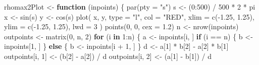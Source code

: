 \documentclass[
  12pt,
  letterpaper,
  DIV=11,
  numbers=noendperiod]{scrreprt}
\newenvironment{Shaded}{\begin{snugshade}}{\end{snugshade}}
\newcommand{\AttributeTok}[1]{\textcolor[rgb]{0.40,0.45,0.13}{#1}}
\newcommand{\ControlFlowTok}[1]{\textcolor[rgb]{0.00,0.23,0.31}{\textbf{#1}}}
\newcommand{\DecValTok}[1]{\textcolor[rgb]{0.68,0.00,0.00}{#1}}
\newcommand{\FloatTok}[1]{\textcolor[rgb]{0.68,0.00,0.00}{#1}}
\newcommand{\FunctionTok}[1]{\textcolor[rgb]{0.28,0.35,0.67}{#1}}
\newcommand{\NormalTok}[1]{\textcolor[rgb]{0.00,0.23,0.31}{#1}}
\newcommand{\OtherTok}[1]{\textcolor[rgb]{0.00,0.23,0.31}{#1}}
\newcommand{\SpecialCharTok}[1]{\textcolor[rgb]{0.37,0.37,0.37}{#1}}
\newcommand{\StringTok}[1]{\textcolor[rgb]{0.13,0.47,0.30}{#1}}
\theoremstyle{remark}
\begin{document}
\begin{Shaded}
\begin{Highlighting}[]
\NormalTok{rhomax2Plot }\OtherTok{\textless{}{-}} \ControlFlowTok{function}\NormalTok{ (inpoints) \{}
  \FunctionTok{par}\NormalTok{(}\AttributeTok{pty =} \StringTok{"s"}\NormalTok{)}
\NormalTok{  s }\OtherTok{\textless{}{-}}\NormalTok{ (}\DecValTok{0}\SpecialCharTok{:}\DecValTok{500}\NormalTok{) }\SpecialCharTok{/} \DecValTok{500} \SpecialCharTok{*} \DecValTok{2} \SpecialCharTok{*}\NormalTok{ pi}
\NormalTok{  x }\OtherTok{\textless{}{-}} \FunctionTok{sin}\NormalTok{(s)}
\NormalTok{  y }\OtherTok{\textless{}{-}} \FunctionTok{cos}\NormalTok{(s)}
  \FunctionTok{plot}\NormalTok{(}
\NormalTok{    x,}
\NormalTok{    y,}
    \AttributeTok{type =} \StringTok{"l"}\NormalTok{,}
    \AttributeTok{col =} \StringTok{"RED"}\NormalTok{,}
    \AttributeTok{xlim =} \FunctionTok{c}\NormalTok{(}\SpecialCharTok{{-}}\FloatTok{1.25}\NormalTok{, }\FloatTok{1.25}\NormalTok{),}
    \AttributeTok{ylim =} \FunctionTok{c}\NormalTok{(}\SpecialCharTok{{-}}\FloatTok{1.25}\NormalTok{, }\FloatTok{1.25}\NormalTok{),}
    \AttributeTok{lwd =} \DecValTok{3}
\NormalTok{  )}
  \FunctionTok{points}\NormalTok{(}\DecValTok{0}\NormalTok{, }\DecValTok{0}\NormalTok{, }\AttributeTok{cex =} \FloatTok{1.2}\NormalTok{)}
\NormalTok{  n }\OtherTok{\textless{}{-}} \FunctionTok{nrow}\NormalTok{(inpoints)}
\NormalTok{  outpoints }\OtherTok{\textless{}{-}} \FunctionTok{matrix}\NormalTok{(}\DecValTok{0}\NormalTok{, n, }\DecValTok{2}\NormalTok{)}
  \ControlFlowTok{for}\NormalTok{ (i }\ControlFlowTok{in} \DecValTok{1}\SpecialCharTok{:}\NormalTok{n) \{}
\NormalTok{    a }\OtherTok{\textless{}{-}}\NormalTok{ inpoints[i, ]}
    \ControlFlowTok{if}\NormalTok{ (i }\SpecialCharTok{==}\NormalTok{ n) \{}
\NormalTok{      b }\OtherTok{\textless{}{-}}\NormalTok{ inpoints[}\DecValTok{1}\NormalTok{, ]}
\NormalTok{    \} }\ControlFlowTok{else}\NormalTok{ \{}
\NormalTok{      b }\OtherTok{\textless{}{-}}\NormalTok{ inpoints[i }\SpecialCharTok{+} \DecValTok{1}\NormalTok{, ]}
\NormalTok{    \}}
\NormalTok{    d }\OtherTok{\textless{}{-}}\NormalTok{ a[}\DecValTok{1}\NormalTok{] }\SpecialCharTok{*}\NormalTok{ b[}\DecValTok{2}\NormalTok{] }\SpecialCharTok{{-}}\NormalTok{ a[}\DecValTok{2}\NormalTok{] }\SpecialCharTok{*}\NormalTok{ b[}\DecValTok{1}\NormalTok{]}
\NormalTok{    outpoints[i, }\DecValTok{1}\NormalTok{] }\OtherTok{\textless{}{-}}\NormalTok{ (b[}\DecValTok{2}\NormalTok{] }\SpecialCharTok{{-}}\NormalTok{ a[}\DecValTok{2}\NormalTok{]) }\SpecialCharTok{/}\NormalTok{ d}
\NormalTok{    outpoints[i, }\DecValTok{2}\NormalTok{] }\OtherTok{\textless{}{-}}\NormalTok{ (a[}\DecValTok{1}\NormalTok{] }\SpecialCharTok{{-}}\NormalTok{ b[}\DecValTok{1}\NormalTok{]) }\SpecialCharTok{/}\NormalTok{ d}

\end{Highlighting}
\end{Shaded}
\end{document}
